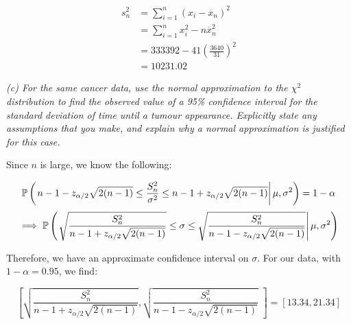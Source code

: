 \documentclass[a4paper]{article}
\begin{document}
                \begin{align*}
                    s_n^2 & = \sum_{i=1}^n (x_i - \overline x_n)^2 \\
                    & = \sum_{i=1}^n x_i^2 - n\overline x_n^2 \\
                    & = 333392 - 41 \left(\frac{3640}{31}\right)^2 \\
                    & = 10231.02
                \end{align*}

            \textit{(c) For the same cancer data, use the normal approximation
            to the $\chi^2$ distribution to find the observed value of a 95\%
            confidence interval for the standard deviation of time until a
            tumour appearance. Explicitly state any assumptions that you make,
            and explain why a normal approximation is justified for this case.}

                Since $n$ is large, we know the following:

                \[
                    \mathbb{P}\left(\left.n - 1 - z_{\alpha/2} \sqrt{2(n-1)} \leq
                    \frac{S_n^2}{\sigma^2} \leq n - 1 +
                    z_{\alpha/2}\sqrt{2(n-1)} \right|\mu, \sigma^2\right) = 1 -
                    \alpha
                \]
                \[
                    \implies \mathbb{P}\left(\left.\sqrt{\frac{S_n^2}{n - 1 +
                    z_{\alpha/2}\sqrt{2(n-1)}}} \leq \sigma \leq
                    \sqrt{\frac{S_n^2}{n - 1 - z_{\alpha/2}\sqrt{2(n-1)}}}
                    \right|\mu, \sigma^2\right)
                \]

                Therefore, we have an approximate confidence interval on
                $\sigma$. For our data, with $1 - \alpha = 0.95$, we find:

                \[
                    \left[\sqrt{\frac{S_n^2}{n - 1 +
                    z_{\alpha/2}\sqrt{2(n-1)}}},
                    \sqrt{\frac{S_n^2}{n - 1 - z_{\alpha/2}\sqrt{2(n-1)}}}\,\,
                    \right] = [13.34, 21.34]
                \]
\end{document}
